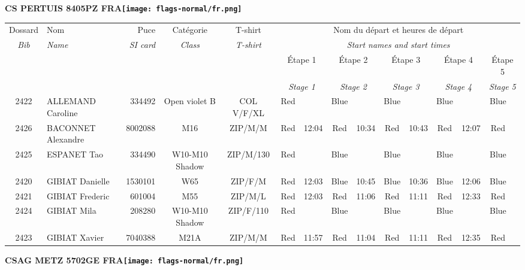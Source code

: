 \documentclass{report}
\begin{document}
\newpage
  \Huge \centering \bfseries CS PERTUIS 8405PZ FRA\normalfont \footnotesize \sffamily \hfill \texttt{[image: flags-normal/fr.png]} \newline 
  \begin{longtable}{|c|l|r|c|c|*{5}{cc|}}
    Dossard & Nom  & Puce    & Catégorie & T-shirt & \multicolumn{10}{c|}{Nom du départ et heures de départ} \\
    \itshape Bib     & \itshape Name & \itshape SI card & \itshape Class  & \itshape  T-shirt  & \multicolumn{10}{c|}{\itshape Start names and start times} \\
    \hline
    & & & & & \multicolumn{2}{c|}{Étape 1} & \multicolumn{2}{c|}{Étape 2} & \multicolumn{2}{c|}{Étape 3} & \multicolumn{2}{c|}{Étape 4} & \multicolumn{2}{c|}{Étape 5} \\
    & & & & & \multicolumn{2}{c|}{\itshape Stage 1} & \multicolumn{2}{c|}{\itshape Stage 2} & \multicolumn{2}{c|}{\itshape Stage 3} & \multicolumn{2}{c|}{\itshape Stage 4} & \multicolumn{2}{c|}{\itshape Stage 5} \\
    \hline
    2422 & ALLEMAND Caroline & 334492 & Open violet B & COL V/F/XL & Red &   & Blue &   & Blue &   & Blue &   & Blue &  \\
    2426 & BACONNET Alexandre & 8002088 & M16 & ZIP/M/M & Red & 12:04 & Red & 10:34 & Red & 10:43 & Red & 12:07 & Red &  \\
    2425 & ESPANET Tao & 334490 & W10-M10 Shadow & ZIP/M/130 & Red &   & Blue &   & Blue &   & Blue &   & Blue &  \\
    2420 & GIBIAT Danielle & 1530101 & W65 & ZIP/F/M & Red & 12:03 & Blue & 10:45 & Blue & 10:36 & Blue & 12:06 & Blue &  \\
    2421 & GIBIAT Frederic & 601004 & M55 & ZIP/M/L & Red & 12:03 & Red & 11:06 & Red & 11:11 & Red & 12:33 & Red &  \\
    2424 & GIBIAT Mila & 208280 & W10-M10 Shadow & ZIP/F/110 & Red &   & Blue &   & Blue &   & Blue &   & Blue &  \\
    2423 & GIBIAT Xavier & 7040388 & M21A & ZIP/M/M & Red & 11:57 & Red & 11:04 & Red & 11:11 & Red & 12:35 & Red &  \\
  \end{longtable}
\newpage
  \Huge \centering \bfseries CSAG METZ 5702GE FRA\normalfont \footnotesize \sffamily \hfill \texttt{[image: flags-normal/fr.png]} \newline 
\end{document}
